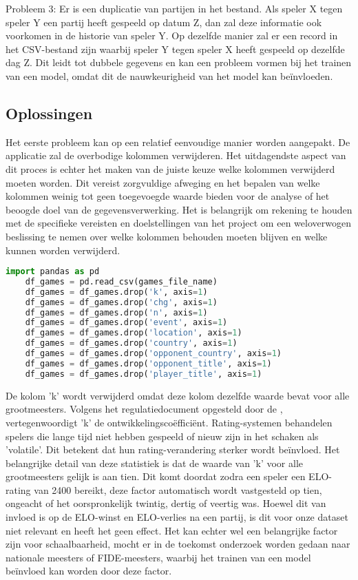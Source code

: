 Probleem 3: Er is een duplicatie van partijen in het bestand. Als speler X tegen speler Y een partij heeft gespeeld op datum Z, dan zal deze informatie ook voorkomen in de historie van speler Y. Op dezelfde manier zal er een record in het CSV-bestand zijn waarbij speler Y tegen speler X heeft gespeeld op dezelfde dag Z. Dit leidt tot dubbele gegevens en kan een probleem vormen bij het trainen van een model, omdat dit de nauwkeurigheid van het model kan beïnvloeden.

\subsection{Oplossingen}

Het eerste probleem kan op een relatief eenvoudige manier worden aangepakt. De applicatie zal de overbodige kolommen verwijderen. Het uitdagendste aspect van dit proces is echter het maken van de juiste keuze welke kolommen verwijderd moeten worden. Dit vereist zorgvuldige afweging en het bepalen van welke kolommen weinig tot geen toegevoegde waarde bieden voor de analyse of het beoogde doel van de gegevensverwerking. Het is belangrijk om rekening te houden met de specifieke vereisten en doelstellingen van het project om een weloverwogen beslissing te nemen over welke kolommen behouden moeten blijven en welke kunnen worden verwijderd.

\begin{lstlisting}[language=Python]
    import pandas as pd
    df_games = pd.read_csv(games_file_name)
    df_games = df_games.drop('k', axis=1)
    df_games = df_games.drop('chg', axis=1)
    df_games = df_games.drop('n', axis=1)
    df_games = df_games.drop('event', axis=1)
    df_games = df_games.drop('location', axis=1)
    df_games = df_games.drop('country', axis=1)
    df_games = df_games.drop('opponent_country', axis=1)
    df_games = df_games.drop('opponent_title', axis=1)
    df_games = df_games.drop('player_title', axis=1)
\end{lstlisting}

De kolom 'k' wordt verwijderd omdat deze kolom dezelfde waarde bevat voor alle grootmeesters. Volgens het regulatiedocument opgesteld door de \textcite{FIDE2021}, vertegenwoordigt 'k' de ontwikkelingscoëfficiënt. Rating-systemen behandelen spelers die lange tijd niet hebben gespeeld of nieuw zijn in het schaken als 'volatile'. Dit betekent dat hun rating-verandering sterker wordt beïnvloed. Het belangrijke detail van deze statistiek is dat de waarde van 'k' voor alle grootmeesters gelijk is aan tien. Dit komt doordat zodra een speler een ELO-rating van 2400 bereikt, deze factor automatisch wordt vastgesteld op tien, ongeacht of het oorspronkelijk twintig, dertig of veertig was. Hoewel dit van invloed is op de ELO-winst en ELO-verlies na een partij, is dit voor onze dataset niet relevant en heeft het geen effect. Het kan echter wel een belangrijke factor zijn voor schaalbaarheid, mocht er in de toekomst onderzoek worden gedaan naar nationale meesters of FIDE-meesters, waarbij het trainen van een model beïnvloed kan worden door deze factor.



